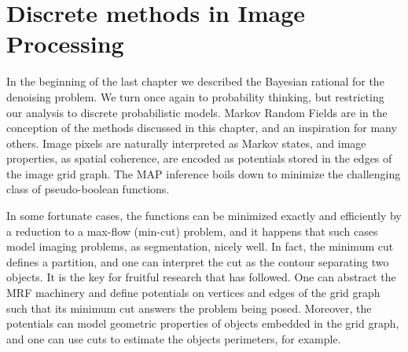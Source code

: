 \chapter{Discrete methods in Image Processing}
\label{chapter:discrete-methods-in-image-processing}


In the beginning of the last chapter we described the Bayesian rational for the denoising problem. We turn once again to probability thinking, but restricting our analysis to discrete probabilistic models. Markov Random Fields are in the conception of the methods discussed in this chapter, and an inspiration for many others. Image pixels are naturally interpreted as Markov states, and image properties, as spatial coherence, are encoded as potentials stored in the edges of the image grid graph. The MAP inference boils down to minimize the challenging class of pseudo-boolean functions. 

In some fortunate cases, the functions can be minimized exactly and efficiently by a reduction to a max-flow (min-cut) problem, and it happens that such cases model imaging problems, as segmentation, nicely well. In fact, the minimum cut defines a partition, and one can interpret the cut as the contour separating two objects. It is the key for fruitful research that has followed. One can abstract the MRF machinery and define potentials on vertices and edges of the grid graph such that its minimum cut answers the problem being posed. Moreover, the potentials can model geometric properties of objects embedded in the grid graph, and one can use cuts to estimate the objects perimeters, for example.

